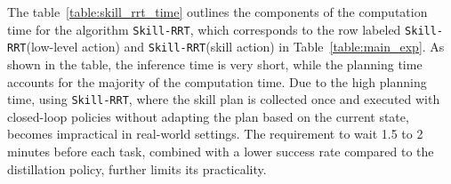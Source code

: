 The table~\ref{table:skill_rrt_time} outlines the components of the computation time for the algorithm \texttt{Skill-RRT}, which corresponds to the row labeled \texttt{Skill-RRT}(low-level action) and \texttt{Skill-RRT}(skill action) in Table~\ref{table:main_exp}.
As shown in the table, the inference time is very short, while the planning time accounts for the majority of the computation time. Due to the high planning time, using \texttt{Skill-RRT}, where the skill plan is collected once and executed with closed-loop policies without adapting the plan based on the current state, becomes impractical in real-world settings. The requirement to wait 1.5 to 2 minutes before each task, combined with a lower success rate compared to the distillation policy, further limits its practicality.